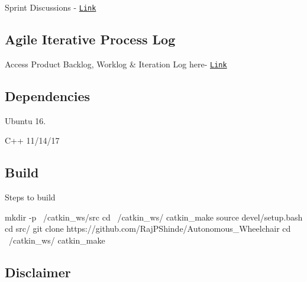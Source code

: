Sprint Discussion\textquotesingle{}s -\/ \href{https://docs.google.com/document/d/1YxuiONLKsmspN5a6GJSREl9pPx3vZLULn2Mh-LnGHLA/edit?usp=sharing}{\tt Link}

\subsection*{Agile Iterative Process Log}

Access Product Backlog, Worklog \& Iteration Log here-\/ \href{https://docs.google.com/spreadsheets/d/16jTj_WTD0Le5l6ijkAiI3PhKVDuv9GQzufeO_Imgy9o/edit?usp=sharing}{\tt Link}

\subsection*{Dependencies}


\begin{DoxyEnumerate}
\item Ubuntu 16.
\item C++ 11/14/17
\end{DoxyEnumerate}

\subsection*{Build}

Steps to build 
\begin{DoxyCode}
mkdir -p ~/catkin\_ws/src
cd ~/catkin\_ws/
catkin\_make
source devel/setup.bash
cd src/
git clone https://github.com/RajPShinde/Autonomous\_Wheelchair
cd ~/catkin\_ws/
catkin\_make
\end{DoxyCode}


\subsection*{Disclaimer}


